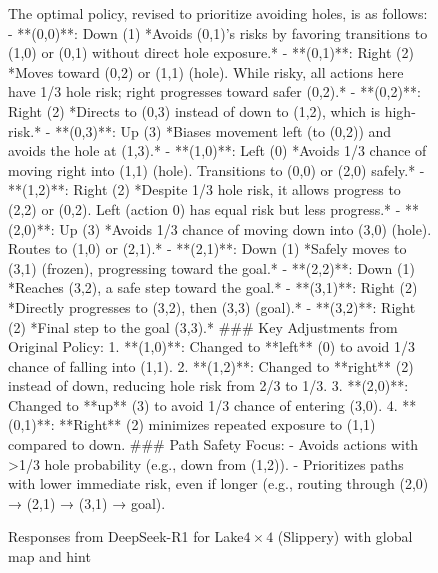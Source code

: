 \documentclass{article}
\begin{document}
\begin{figure}
\begin{mdframed}[roundcorner=10pt]
The optimal policy, revised to prioritize avoiding holes, is as follows:
- **(0,0)**: Down (1)
  *Avoids (0,1)'s risks by favoring transitions to (1,0) or (0,1) without direct hole exposure.*
- **(0,1)**: Right (2)
  *Moves toward (0,2) or (1,1) (hole). While risky, all actions here have 1/3 hole risk; right progresses toward safer (0,2).*
- **(0,2)**: Right (2)
  *Directs to (0,3) instead of down to (1,2), which is high-risk.*
- **(0,3)**: Up (3)
  *Biases movement left (to (0,2)) and avoids the hole at (1,3).*
- **(1,0)**: Left (0)
  *Avoids 1/3 chance of moving right into (1,1) (hole). Transitions to (0,0) or (2,0) safely.*
- **(1,2)**: Right (2)
  *Despite 1/3 hole risk, it allows progress to (2,2) or (0,2). Left (action 0) has equal risk but less progress.*
- **(2,0)**: Up (3)
  *Avoids 1/3 chance of moving down into (3,0) (hole). Routes to (1,0) or (2,1).*
- **(2,1)**: Down (1)
  *Safely moves to (3,1) (frozen), progressing toward the goal.*
- **(2,2)**: Down (1)
  *Reaches (3,2), a safe step toward the goal.*
- **(3,1)**: Right (2)
  *Directly progresses to (3,2), then (3,3) (goal).*
- **(3,2)**: Right (2)
  *Final step to the goal (3,3).*
\#\#\# Key Adjustments from Original Policy:
1. **(1,0)**: Changed to **left** (0) to avoid 1/3 chance of falling into (1,1).
2. **(1,2)**: Changed to **right** (2) instead of down, reducing hole risk from 2/3 to 1/3.
3. **(2,0)**: Changed to **up** (3) to avoid 1/3 chance of entering (3,0).
4. **(0,1)**: **Right** (2) minimizes repeated exposure to (1,1) compared to down.
\#\#\# Path Safety Focus:
- Avoids actions with >1/3 hole probability (e.g., down from (1,2)).
- Prioritizes paths with lower immediate risk, even if longer (e.g., routing through (2,0) → (2,1) → (3,1) → goal).
\end{mdframed}
\caption{Responses from DeepSeek-R1 for Lake$4\times4$ (Slippery) with global map and hint}
\label{page:results_ds_wo_hint}
\end{figure}
\end{document}
